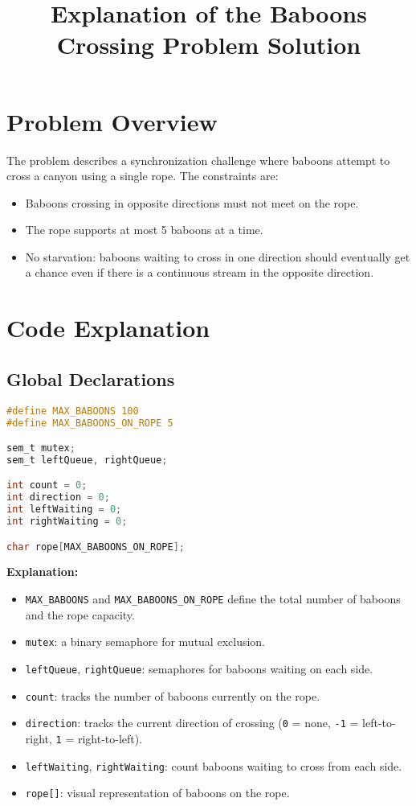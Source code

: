 \documentclass{article}
\title{Explanation of the Baboons Crossing Problem Solution}
\author{}
\date{}
\begin{document}
\maketitle

\section*{Problem Overview}

The problem describes a synchronization challenge where baboons attempt to cross a canyon using a single rope. The constraints are:

\begin{itemize}
    \item Baboons crossing in opposite directions must not meet on the rope.
    \item The rope supports at most 5 baboons at a time.
    \item No starvation: baboons waiting to cross in one direction should eventually get a chance even if there is a continuous stream in the opposite direction.
\end{itemize}

\section*{Code Explanation}

\subsection*{Global Declarations}

\begin{lstlisting}[language=C]
#define MAX_BABOONS 100
#define MAX_BABOONS_ON_ROPE 5

sem_t mutex;
sem_t leftQueue, rightQueue;

int count = 0;
int direction = 0;
int leftWaiting = 0;
int rightWaiting = 0;

char rope[MAX_BABOONS_ON_ROPE];
\end{lstlisting}

\textbf{Explanation:}
\begin{itemize}
    \item \texttt{MAX\_BABOONS} and \texttt{MAX\_BABOONS\_ON\_ROPE} define the total number of baboons and the rope capacity.
    \item \texttt{mutex}: a binary semaphore for mutual exclusion.
    \item \texttt{leftQueue}, \texttt{rightQueue}: semaphores for baboons waiting on each side.
    \item \texttt{count}: tracks the number of baboons currently on the rope.
    \item \texttt{direction}: tracks the current direction of crossing (\texttt{0} = none, \texttt{-1} = left-to-right, \texttt{1} = right-to-left).
    \item \texttt{leftWaiting}, \texttt{rightWaiting}: count baboons waiting to cross from each side.
    \item \texttt{rope[]}: visual representation of baboons on the rope.
\end{itemize}
\end{document}
